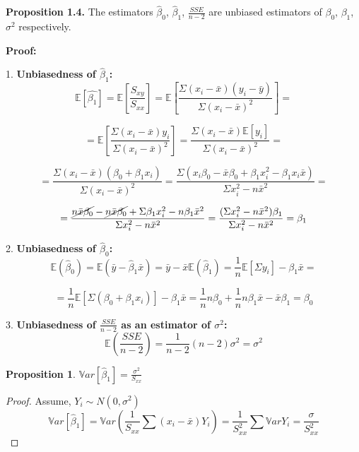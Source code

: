 \documentclass[12pt,a4paper,oneside]{book} %
\newtheorem{proposition}[theorem]{Proposition}
\begin{document}
\textbf{Proposition 1.4.} The estimators $\hat{\beta}_0$, $\hat{\beta}_1$, $\frac{SSE}{n-2}$ are unbiased estimators of $\beta_0$, $\beta_1$, $\sigma^2$ respectively.



\textbf{Proof:}

1. \textbf{Unbiasedness of $\hat{\beta}_1$:}
\[
\mathbb{E} [ \hat{\beta _1} ] = \mathbb{E} [\frac{S_{xy}}{S_{xx}}] = \mathbb{E} [\frac{\Sigma (x_i - \bar{x})(y_i-\bar{y})}{\Sigma (x_i-\bar{x})^2}]=
\]

\[
	= \mathbb{E} [\frac{\Sigma (x_i - \bar{x})y_i}{\Sigma (x_i-\bar{x})^2}]=
	\frac{\Sigma (x_i - \bar{x})\mathbb{E} [y_i]}{\Sigma (x_i-\bar{x})^2}=
\]

\[
	= \frac{\Sigma (x_i - \bar{x})(\beta_0+\beta_1x_i)}{\Sigma (x_i-\bar{x})^2}=	
	\frac{\Sigma (x_i \beta_0 - \bar{x}\beta_0+\beta_1x_i^2-\beta_1x_i\bar{x})}{\Sigma x_i^2-n\bar{x}^2}=
\]

\[
	= \frac{\cancel{n\bar{x}\beta_0}-\cancel{n\bar{x}\beta_0}+\Sigma\beta_1x_i^2-n\beta_1\bar{x}^2}{\Sigma x_i^2-n\bar{x}^2}= \frac{(\Sigma x_i^2-n\bar{x}^2)\beta_1}{\Sigma x_i^2-n\bar{x}^2} = \beta_1
\]


2. \textbf{Unbiasedness of $\hat{\beta}_0$:}
\[
\mathbb{E}(\hat{\beta}_0) = \mathbb{E}(\bar{y} - \hat{\beta}_1 \bar{x}) = \bar{y} - \bar{x} \mathbb{E}(\hat{\beta}_1) = \frac{1}{n}\mathbb{E}[\Sigma y_i]-\beta_1 \bar{x} =
\] 

\[
	= \frac{1}{n}\mathbb{E}[\Sigma (\beta_0+\beta_1x_i)]-\beta_1 \bar{x} 
	= \frac{1}{n}n\beta_0+\frac{1}{n}n\beta_1\bar{x}-\bar{x}\beta_1=\beta_0	
\]


3. \textbf{Unbiasedness of $\frac{SSE}{n-2}$ as an estimator of $\sigma^2$:}
\[
\mathbb{E}\left(\frac{SSE}{n-2}\right) = \frac{1}{n-2} (n - 2) \sigma^2 = \sigma^2
\]


\begin{proposition}
	$\mathbb{V}ar[\hat{\beta}_1] = \frac{\sigma^2}{S_{xx}}$
\end{proposition}

\begin{proof}
	Assume, $Y_i \sim N(0, \sigma^2) $
	\[
		\mathbb{V}ar[\hat{\beta}_1] = \mathbb{V}ar (\frac{1}{S_{xx}}\sum (x_i-\bar{x})Y_i) = \frac{1}{S_{xx}^2}\sum \mathbb{V}ar Y_i = \frac{\sigma}{S_{xx}^2}
	\]
\end{proof}



\end{document}
